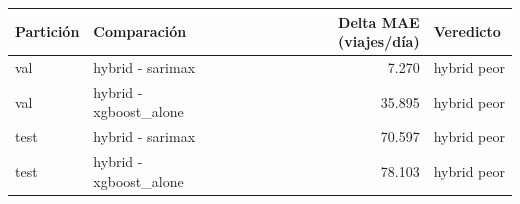 \begin{tabular}{llrl}
\toprule
\rowcolor{naranja}
\textbf{Partición} & \textbf{Comparación} & \textbf{Delta MAE (viajes/\allowbreak{}día)} & \textbf{Veredicto} \\
\midrule
\rowcolor{filaclara} val & hybrid - sarimax & 7.270 & hybrid peor \\
val & hybrid - xgboost\_\allowbreak{}alone & 35.895 & hybrid peor \\
\rowcolor{filaclara} test & hybrid - sarimax & 70.597 & hybrid peor \\
test & hybrid - xgboost\_\allowbreak{}alone & 78.103 & hybrid peor \\
\bottomrule
\end{tabular}
